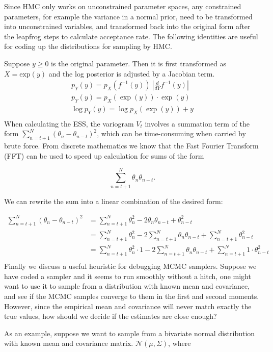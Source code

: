 \documentclass[12pt]{report}
\begin{document}
Since HMC only works on unconstrained parameter spaces, any constrained parameters, for example the variance in a normal prior, need to be transformed into unconstrained variables, and transformed back into the original form after the leapfrog steps to calculate acceptance rate. The following identities are useful for coding up the distributions for sampling by HMC.

Suppose $y \ge 0 $ is the original parameter. Then it is first transformed as $X = \text{exp}(y) $ and the log posterior is adjusted by a Jacobian term.
\begin{align*}
p_Y(y) = p_X(f^{-1}(y)) \ |\frac{d}{dY} f^{-1}(y) |\\
p_Y(y) = p_X(\exp(y)) \cdot \exp(y) \\
\log p_Y(y) = \log p_X(\exp(y)) + y \\
\end{align*}
When calculating the ESS, the variogram $V_t$ involves a summation term of the form $\sum_{n=t+1}^N (\theta_{n} - \theta_{n-t})^2$, which can be time-consuming when carried by brute force. From discrete mathematics we know that the Fast Fourier Transform (FFT) can be used to speed up calculation for sums of the form 

\[ \sum_{n=t+1}^N \theta_n \theta_{n-t}.  \]

We can rewrite the sum into a linear combination of the desired form:

\begin{align*}
 \sum_{n=t+1}^N (\theta_{n} - \theta_{n-t})^2 &= \sum_{n=t+1}^N \theta_n^2 - 2 \theta_n \theta_{n-t} + \theta_{n-t}^2  \\
 &= \sum_{n=t+1}^N \theta_n^2 -2 \sum_{n=t+1}^N \theta_n \theta_{n-t} + \sum_{n=t+1}^N \theta_{n-t}^2 \\ 
  &= \sum_{n=t+1}^N  \theta_n^2 \cdot 1  -2 \sum_{n=t+1}^N \theta_n \theta_{n-t} + \sum_{n=t+1}^N 1 \cdot \theta_{n-t}^2 \\
\end{align*}
Finally we discuss a useful heuristic for debugging MCMC samplers. Suppose we have coded a sampler and it seems to run smoothly without a hitch, one might want to use it to sample from a distribution with known mean and covariance, and see if the MCMC samples converge to them in the first and second moments. However, since the empirical mean and covariance will never match exactly the true values, how should we decide if the estimates are close enough?


As an example, suppose we want to sample from a bivariate normal distribution with known mean and covariance matrix. $\mathcal{N}(\mu,\Sigma) $, where 
\end{document}
